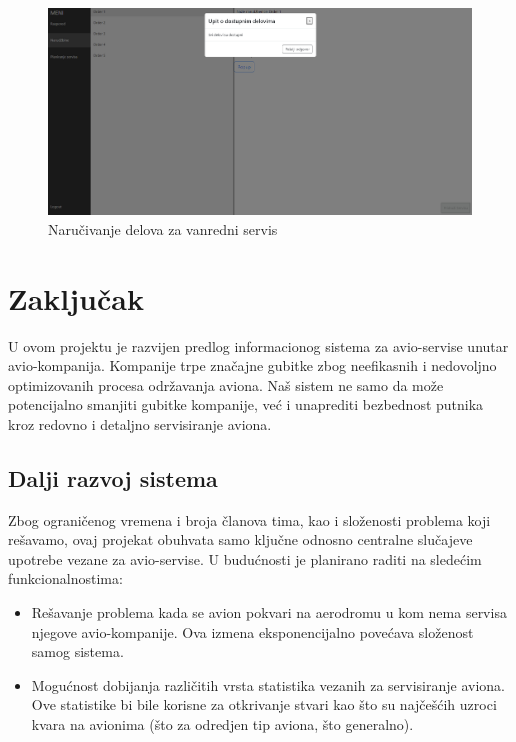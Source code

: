 \documentclass[a4paper]{article}
\begin{document}
\begin{figure}[H]
\begin{center}
\includegraphics[scale=0.3]{UI/narucivanje_delova_za_vanredni_servis_3.png}
\end{center}
\caption{Naručivanje delova za vanredni servis}
\label{fig:ui_naručivanje_3}
\end{figure}

\pagebreak

\section{Zaključak}
\label{sec:zakljucak}

U ovom projektu je razvijen predlog informacionog sistema za avio-servise unutar avio-kompanija. Kompanije trpe značajne gubitke zbog neefikasnih i nedovoljno optimizovanih procesa održavanja aviona. Naš sistem ne samo da može potencijalno smanjiti gubitke kompanije, već i unaprediti bezbednost putnika kroz redovno i detaljno servisiranje aviona.

\subsection{Dalji razvoj sistema}
\label{subsec:dalji_razvoj}

Zbog ograničenog vremena i broja članova tima, kao i složenosti problema koji rešavamo, ovaj projekat obuhvata samo ključne odnosno centralne slučajeve upotrebe vezane za avio-servise. U budućnosti je planirano raditi na sledećim funkcionalnostima:
\begin{itemize}
    \item Rešavanje problema kada se avion pokvari na aerodromu u kom nema servisa njegove avio-kompanije. Ova izmena eksponencijalno povećava složenost samog sistema.
    \item Mogućnost dobijanja različitih vrsta statistika vezanih za servisiranje aviona. Ove statistike bi bile korisne za otkrivanje stvari kao što su najčešćih uzroci kvara na avionima (što za odredjen tip aviona, što generalno).
\end{itemize}
\end{document}
